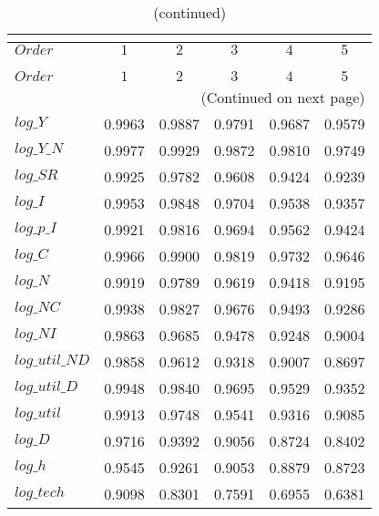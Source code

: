  
\begin{center}
\begin{longtable}{lccccc} 
\caption{COEFFICIENTS OF AUTOCORRELATION}\\
 \label{Table:th_autocorr_matrix}\\
\toprule 
$Order          $	 & 	 $         1$	 & 	 $         2$	 & 	 $         3$	 & 	 $         4$	 & 	 $         5$\\
\midrule \endfirsthead 
\caption{(continued)}\\
 \toprule \\ 
$Order          $	 & 	 $         1$	 & 	 $         2$	 & 	 $         3$	 & 	 $         4$	 & 	 $         5$\\
\midrule \endhead 
\midrule \multicolumn{6}{r}{(Continued on next page)} \\ \bottomrule \endfoot 
\bottomrule \endlastfoot 
$log\_Y         $	 & 	    0.9963	 & 	    0.9887	 & 	    0.9791	 & 	    0.9687	 & 	    0.9579 \\ 
$log\_Y\_N      $	 & 	    0.9977	 & 	    0.9929	 & 	    0.9872	 & 	    0.9810	 & 	    0.9749 \\ 
$log\_SR        $	 & 	    0.9925	 & 	    0.9782	 & 	    0.9608	 & 	    0.9424	 & 	    0.9239 \\ 
$log\_I         $	 & 	    0.9953	 & 	    0.9848	 & 	    0.9704	 & 	    0.9538	 & 	    0.9357 \\ 
$log\_p\_I      $	 & 	    0.9921	 & 	    0.9816	 & 	    0.9694	 & 	    0.9562	 & 	    0.9424 \\ 
$log\_C         $	 & 	    0.9966	 & 	    0.9900	 & 	    0.9819	 & 	    0.9732	 & 	    0.9646 \\ 
$log\_N         $	 & 	    0.9919	 & 	    0.9789	 & 	    0.9619	 & 	    0.9418	 & 	    0.9195 \\ 
$log\_NC        $	 & 	    0.9938	 & 	    0.9827	 & 	    0.9676	 & 	    0.9493	 & 	    0.9286 \\ 
$log\_NI        $	 & 	    0.9863	 & 	    0.9685	 & 	    0.9478	 & 	    0.9248	 & 	    0.9004 \\ 
$log\_util\_ND  $	 & 	    0.9858	 & 	    0.9612	 & 	    0.9318	 & 	    0.9007	 & 	    0.8697 \\ 
$log\_util\_D   $	 & 	    0.9948	 & 	    0.9840	 & 	    0.9695	 & 	    0.9529	 & 	    0.9352 \\ 
$log\_util      $	 & 	    0.9913	 & 	    0.9748	 & 	    0.9541	 & 	    0.9316	 & 	    0.9085 \\ 
$log\_D         $	 & 	    0.9716	 & 	    0.9392	 & 	    0.9056	 & 	    0.8724	 & 	    0.8402 \\ 
$log\_h         $	 & 	    0.9545	 & 	    0.9261	 & 	    0.9053	 & 	    0.8879	 & 	    0.8723 \\ 
$log\_tech      $	 & 	    0.9098	 & 	    0.8301	 & 	    0.7591	 & 	    0.6955	 & 	    0.6381 \\ 
\end{longtable}
 \end{center}
